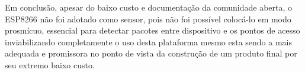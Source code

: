 Em conclusão, apesar do baixo custo e documentação da comunidade aberta, o
ESP8266 não foi adotado como sensor, pois não foi possível colocá-lo em modo
prosmícuo, essencial para detectar pacotes entre dispositivo e os pontos de
acesso inviabilizando completamente o uso desta plataforma mesmo esta sendo a
mais adequada e promissora no ponto de vista da construção de um produto final
por seu extremo baixo custo.
